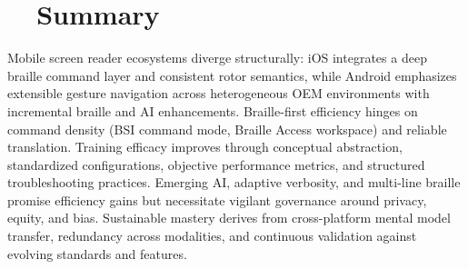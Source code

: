 \section{~~Summary}
\label{sec:sr26-summary}
Mobile screen reader ecosystems diverge structurally: iOS integrates a deep braille command layer and consistent rotor semantics, while Android emphasizes extensible gesture navigation across heterogeneous OEM environments with incremental braille and AI enhancements. Braille-first efficiency hinges on command density (BSI command mode, Braille Access workspace) and reliable translation. Training efficacy improves through conceptual abstraction, standardized configurations, objective performance metrics, and structured troubleshooting practices. Emerging AI, adaptive verbosity, and multi-line braille promise efficiency gains but necessitate vigilant governance around privacy, equity, and bias. Sustainable mastery derives from cross-platform mental model transfer, redundancy across modalities, and continuous validation against evolving standards and features.

